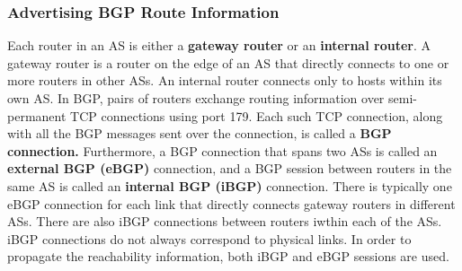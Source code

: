 \subsubsection{Advertising BGP Route Information}
Each router in an AS is either a \textbf{gateway router} or an \textbf{internal router}. A gateway router is a router on the edge of an AS that directly connects to one or more routers in other ASs. An internal router connects only to hosts within its own AS. In BGP, pairs of routers exchange routing information over semi-permanent TCP connections using port 179. Each such TCP connection, along with all the BGP messages sent over the connection, is called a \textbf{BGP connection.} Furthermore, a BGP connection that spans two ASs is called an \textbf{external BGP (eBGP)} connection, and a BGP session between routers in the same AS is called an \textbf{internal BGP (iBGP)} connection.  There is typically one eBGP connection for each link that directly connects gateway routers in different ASs. There are also iBGP connections between routers iwthin each of the ASs. iBGP connections do not always correspond to physical links. In order to propagate the reachability information, both iBGP and eBGP sessions are used.

